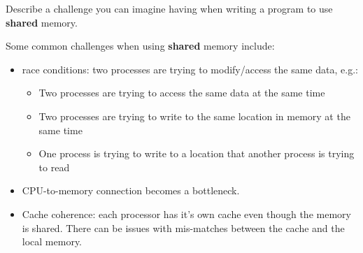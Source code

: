 \documentclass[12pt, answers]{exam}
\begin{document}
\begin{questions}

\addpoints
\question 
{}


\vspace*{2em}
\addpoints
\question 
{}


\vspace*{2em}
\addpoints
\question[5] Describe a challenge you can imagine having when writing a program to use \textbf{shared} memory.

\begin{solution}
Some common challenges when using \textbf{shared} memory include:
\begin{itemize}
\item race conditions: two processes are trying to modify/access the same data, e.g.:
\begin{itemize}
\item Two processes are trying to access the same data at the same time 
\item Two processes are trying to write to the same location in memory at the same time 
\item One process is trying to write to a location that another process is trying to read
\end{itemize}
\item CPU-to-memory connection becomes a bottleneck.
\item Cache coherence: each processor has it's own cache even though the memory is shared. There can be issues with mis-matches between the cache and the local memory. 
\end{itemize}
\end{solution}


\end{questions}
\end{document}
